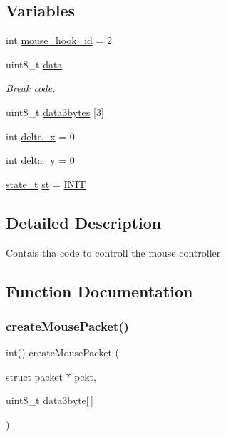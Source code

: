 \subsection*{Variables}
\begin{DoxyCompactItemize}
\item 
int \hyperlink{group__mouse_ga37cad7cad93664f8a1ed1b0258fe958b}{mouse\+\_\+hook\+\_\+id} = 2
\item 
uint8\+\_\+t \hyperlink{group__mouse_ga325819a8e492ac69542e8b31705af6e9}{data}
\begin{DoxyCompactList}\small\item\em Break code. \end{DoxyCompactList}\item 
uint8\+\_\+t \hyperlink{group__mouse_ga9f33ecfca24a9211fc0fe7d4633087be}{data3bytes} \mbox{[}3\mbox{]}
\item 
int \hyperlink{group__mouse_ga33c33c30bb98b3e86f856cc0f031d1f2}{delta\+\_\+x} = 0
\item 
int \hyperlink{group__mouse_ga293bf93983300c292a4aaa40d7104917}{delta\+\_\+y} = 0
\item 
\hyperlink{mouse_8h_aa0aafed44fec19806d8f9ad834be1248}{state\+\_\+t} \hyperlink{group__mouse_ga9a379079ab305d43e4c73334578f9325}{st} = \hyperlink{mouse_8h_aa0aafed44fec19806d8f9ad834be1248a0cb1b2c6a7db1f1084886c98909a3f36}{I\+N\+IT}
\end{DoxyCompactItemize}


\subsection{Detailed Description}
Contais tha code to controll the mouse controller 

\subsection{Function Documentation}
\mbox{\label{group__mouse_gabd35692be21807c9d3f1ae016fe7d6ec}} 
\subsubsection{\texorpdfstring{create\+Mouse\+Packet()}{createMousePacket()}}
{\footnotesize\ttfamily int() create\+Mouse\+Packet (\begin{DoxyParamCaption}\item[{struct packet $\ast$}]{pckt,  }\item[{uint8\+\_\+t}]{data3byte\mbox{[}$\,$\mbox{]} }\end{DoxyParamCaption})}

